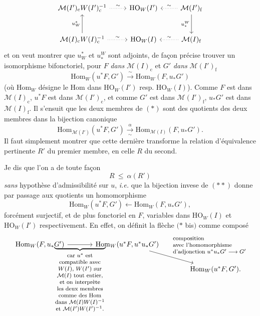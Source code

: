 \documentclass[11pt]{article}
\newcommand{\printedpage}[1]{\marginpar{\footnotesize p.~#1}}
\newcommand{\msp}[1]{\marginpar{\footnotesize [#1]}}
\newcommand{\cM}{\mathcal{M}}
\newcommand{\HO}{\mathrm{HO}}
\newcommand{\Hom}{\mathrm{Hom}}
\newcommand{\rf}{\mathrm{f}}
\newcommand{\rc}{\mathrm{c}}
\begin{document}
\printedpage{38}
\msp{page 68}
\[
\begin{tikzcd}[row sep=large]
\cM(I')_{\rc}W(I')_{\rc}^{-1} \arrow[r, dotted, "\sim"] & \HO_W(I') & \cM(I')_{\rf} \arrow[l, dotted, "\sim"'] \arrow[d, "u_*^W"'] \\
\cM(I)_{\rc}W(I)_{\rc}^{-1} \arrow[r, dotted, "\sim"] \arrow[u, "u_W^*"] & \HO_W(I) & \cM(I)_{\rf} \arrow[l, dotted, "\sim"']
\end{tikzcd}
\]
 et on veut montrer que $u_W^*$ et $u_*^W$ sont adjoints, de façon précise trouver un isomorphisme bifonctoriel, pour $F$ \textit{dans} $\cM(I)_{\rc}$ et $G'$ \textit{dans} $\cM(I')_{\rf}$
\[
\Hom_W(u^*F, G') \xrightarrow{\ \sim\ } \Hom_W(F, u_*G') \tag*{$(*)$}
\]
(où $\Hom_W$ désigne le Hom dans $\HO_W(I')$ resp. $\HO_W(I)$). Comme $F$ est dans $\cM(I)_{\rc}$, $u^*F$ est dans $\cM(I')_{\rc}$, et comme $G'$ est dans $\cM(I')_{\rf}$, $u_*G'$ est dans $\cM(I)_{\rf}$. Il s'ensuit que les deux membres de $(*)$ sont des quotients des deux membres dans la bijection canonique
\[
\Hom_{\cM(I')}(u^*F, G') \xrightarrow[\ \sim\ ]{\alpha} \Hom_{\cM(I)}(F, u_*G'). \tag*{$(**)$}
\]
Il faut simplement montrer que cette dernière transforme la relation d'équivalence pertinente $R'$ du premier membre,
\msp{page 69}
en celle $R$ du second.

Je dis que l'on a de toute façon
\[
R \ \leq \ \alpha(R')
\]
\textit{sans} hypothèse d'admissibilité sur $u$, \textit{i.e.} que la bijection invese de $(**)$ donne par passage aux quotients un homomorphisme %
\[
\Hom_W(u^*F, G') \longleftarrow \Hom_W(F, u_*G'), \tag*{$(***)$}
\]
forcément surjectif, et de plus fonctoriel en $F$, variables dans $\HO_W(I)$ et $\HO_W(I')$ respectivement. En effet, on définit la flèche $(*$ bis$)$ comme composé
\[
\begin{tikzcd}[column sep=large]
\Hom_W(F, u_*G') \arrow[r, "\underbrace{\hspace{2.6cm}}_{\text{\footnotesize\begin{tabular}{@{}c@{}}car $u^*$ est\\ compatible avec\\ $W(I)$, $W(I')$ sur\\ $\cM(I)$ tout entier,\\ et on interprète\\ les deux membres\\ comme des Hom\\ dans $\cM(I)W(I)^{-1}$\\ et $\cM(I')W(I')^{-1}$.\end{tabular}}}"'] & \Hom_W(u^*F, u^*u_*G') \arrow[dr, "\text{\footnotesize\begin{tabular}{@{}l@{}}composition\\ avec l'homomorphisme\\ d'adjonction $u^*u_*G' \longrightarrow G'$\end{tabular}}"] & \\
 & & \Hom_W(u^*F, G').
\end{tikzcd}
\]
\end{document}
